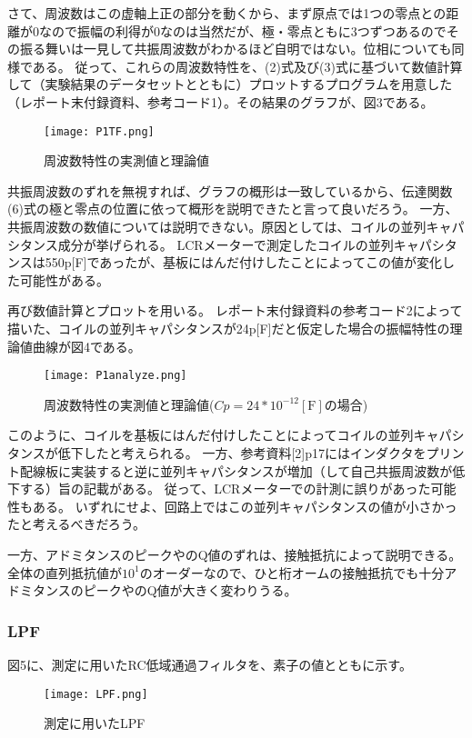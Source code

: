 \documentclass[10pt,a4j,dvipdfmx]{jsarticle}
\begin{document}
さて、周波数はこの虚軸上正の部分を動くから、まず原点では1つの零点との距離が0なので振幅の利得が0なのは当然だが、極・零点ともに3つずつあるのでその振る舞いは一見して共振周波数がわかるほど自明ではない。位相についても同様である。
従って、これらの周波数特性を、(2)式及び(3)式に基づいて数値計算して（実験結果のデータセットとともに）プロットするプログラムを用意した（レポート末付録資料、参考コード1）。その結果のグラフが、図3である。

\begin{figure}[H]
  \centering
  \texttt{[image: P1TF.png]}
  \caption{周波数特性の実測値と理論値}
\end{figure}

共振周波数のずれを無視すれば、グラフの概形は一致しているから、伝達関数(6)式の極と零点の位置に依って概形を説明できたと言って良いだろう。
一方、共振周波数の数値については説明できない。原因としては、コイルの並列キャパシタンス成分が挙げられる。
LCRメーターで測定したコイルの並列キャパシタンスは550p[F]であったが、基板にはんだ付けしたことによってこの値が変化した可能性がある。

再び数値計算とプロットを用いる。
レポート末付録資料の参考コード2によって描いた、コイルの並列キャパシタンスが24p[\si{\farad}]だと仮定した場合の振幅特性の理論値曲線が図4である。

\begin{figure}[H]
  \centering
  \texttt{[image: P1analyze.png]}
  \caption{周波数特性の実測値と理論値($Cp=24*10^{-12}\left[\si{\farad}\right]$の場合)}
\end{figure}

このように、コイルを基板にはんだ付けしたことによってコイルの並列キャパシタンスが低下したと考えられる。
一方、参考資料[2]p17にはインダクタをプリント配線板に実装すると逆に並列キャパシタンスが増加（して自己共振周波数が低下する）旨の記載がある。
従って、LCRメーターでの計測に誤りがあった可能性もある。
いずれにせよ、回路上ではこの並列キャパシタンスの値が小さかったと考えるべきだろう。

一方、アドミタンスのピークやのQ値のずれは、接触抵抗によって説明できる。全体の直列抵抗値が$10^{1}$のオーダーなので、ひと桁オームの接触抵抗でも十分アドミタンスのピークやのQ値が大きく変わりうる。

\subsubsection{LPF}
図5に、測定に用いたRC低域通過フィルタを、素子の値とともに示す。
\begin{figure}[H]
  \centering
  \texttt{[image: LPF.png]}
  \caption{測定に用いたLPF}
\end{figure}
\end{document}
